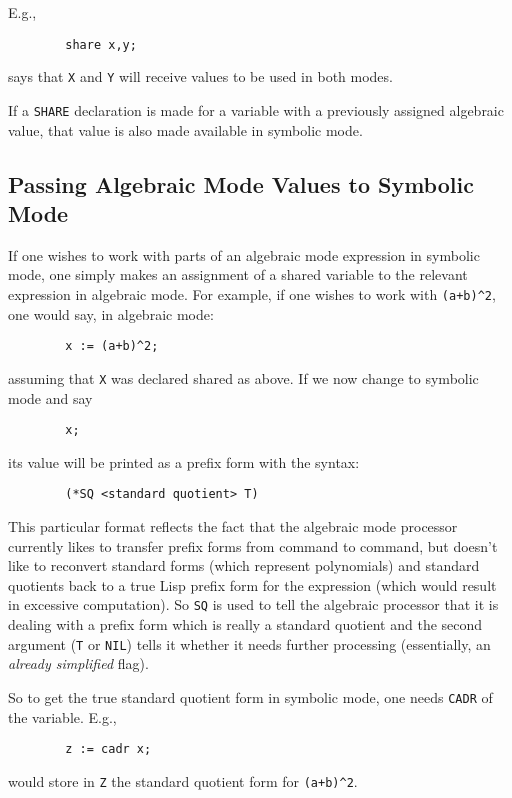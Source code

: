 E.g.,
\begin{verbatim}
        share x,y;
\end{verbatim}
says that {\tt X} and {\tt Y} will receive values to be used in both modes.

If a {\tt SHARE} declaration is made for a variable with a previously
assigned algebraic value, that value is also made available in symbolic
mode.

\subsection{Passing Algebraic Mode Values to Symbolic Mode}

If one wishes to work with parts of an algebraic mode
 expression in symbolic mode, 
one simply makes an assignment  of a shared variable to
the relevant expression in algebraic mode.  For example, if one wishes to
work with {\tt (a+b)\^{ }2}, one would say, in algebraic mode:
\begin{verbatim}
        x := (a+b)^2;
\end{verbatim}
assuming that {\tt X} was declared shared as above.  If we now change to
symbolic mode and say
\begin{verbatim}
        x;
\end{verbatim}
its value will be printed as a prefix form with the syntax:
\begin{verbatim}
        (*SQ <standard quotient> T)
\end{verbatim}
This particular format reflects the fact that the algebraic mode processor
currently likes to transfer prefix forms from command to command, but
doesn't like to reconvert standard forms  (which
represent polynomials) and standard quotients back to a true Lisp prefix
form for the expression (which would result in excessive computation).  So
{\tt *SQ} is used to tell the algebraic processor that it is dealing with
a prefix form which is really a standard quotient  and the second argument ({\tt T} or {\tt NIL}) tells it whether
it needs further processing (essentially, an {\em already simplified}
flag).

So to get the true standard quotient form in symbolic mode, one needs
{\tt CADR} of the variable. E.g.,
\begin{verbatim}
        z := cadr x;
\end{verbatim}
would store in {\tt Z} the standard quotient form for {\tt (a+b)\^{ }2}.

